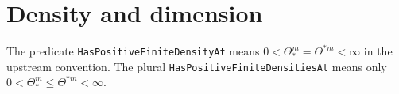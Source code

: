 \section{Density and dimension}

\begin{definition}
\label{def:positive-density}










The predicate \texttt{HasPositiveFiniteDensityAt} means
$0<\Theta_*^m=\Theta^{*m}<\infty$ in the upstream convention.
The plural \texttt{HasPositiveFiniteDensitiesAt} means only
$0<\Theta_*^m\leq\Theta^{*m}<\infty$.
\end{definition}

